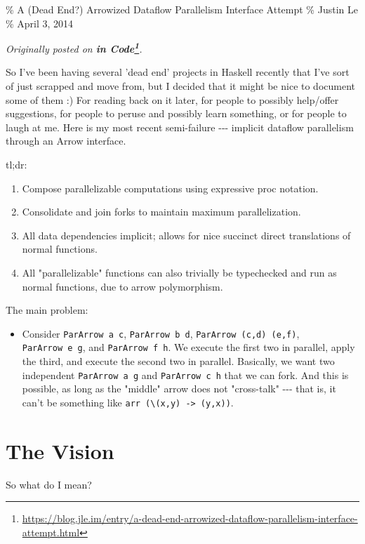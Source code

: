 \documentclass[]{article}
\renewcommand{\href}[2]{#2\footnote{\url{#1}}}
\begin{document}
\% A (Dead End?) Arrowized Dataflow Parallelism Interface Attempt \% Justin Le
\% April 3, 2014

\emph{Originally posted on
\textbf{\href{https://blog.jle.im/entry/a-dead-end-arrowized-dataflow-parallelism-interface-attempt.html}{in
Code}}.}

So I've been having several 'dead end' projects in Haskell recently that I've
sort of just scrapped and move from, but I decided that it might be nice to
document some of them :) For reading back on it later, for people to possibly
help/offer suggestions, for people to peruse and possibly learn something, or
for people to laugh at me. Here is my most recent semi-failure -\/-\/- implicit
dataflow parallelism through an Arrow interface.

tl;dr:

\begin{enumerate}
\tightlist
\item
  Compose parallelizable computations using expressive proc notation.
\item
  Consolidate and join forks to maintain maximum parallelization.
\item
  All data dependencies implicit; allows for nice succinct direct translations
  of normal functions.
\item
  All "parallelizable" functions can also trivially be typechecked and run as
  normal functions, due to arrow polymorphism.
\end{enumerate}

The main problem:

\begin{itemize}
\tightlist
\item
  Consider \texttt{ParArrow\ a\ c}, \texttt{ParArrow\ b\ d},
  \texttt{ParArrow\ (c,d)\ (e,f)}, \texttt{ParArrow\ e\ g}, and
  \texttt{ParArrow\ f\ h}. We execute the first two in parallel, apply the
  third, and execute the second two in parallel. Basically, we want two
  independent \texttt{ParArrow\ a\ g} and \texttt{ParArrow\ c\ h} that we can
  fork. And this is possible, as long as the "middle" arrow does not
  "cross-talk" -\/-\/- that is, it can't be something like
  \texttt{arr\ (\textbackslash{}(x,y)\ -\textgreater{}\ (y,x))}.
\end{itemize}

\section{The Vision}

So what do I mean?
\end{document}

